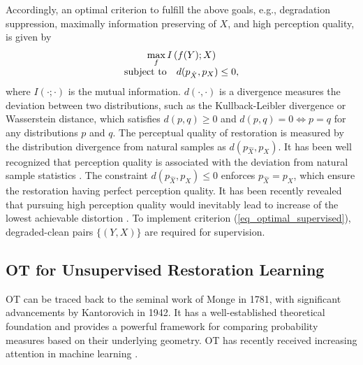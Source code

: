 \documentclass[10pt,journal,compsoc]{IEEEtran}
\begin{document}
Accordingly, an optimal criterion to fulfill the above goals,
e.g., degradation suppression, maximally information preserving of $X$, 
and high perception quality, is given by
\begin{equation}
\begin{array}{c}
\mathop {\max }\limits_f I\left( {f(Y);X} \right)\\
{\rm{subject \ to \ }}~~d({p_{\hat X}},{p_{ X}}) \le 0,
\end{array}
\label{eq_optimal_supervised}
\end{equation}
where $I(\cdot;\cdot)$ is the mutual information.
$d(\cdot,\cdot)$ is a divergence measures 
the deviation between two distributions, 
such as the Kullback-Leibler divergence or Wasserstein distance, 
which satisfies $d(p, q) \geq 0$ and 
$d(p, q) = 0\Leftrightarrow {p = q}$ for any distributions $p$ and $q$. 
The perceptual quality of restoration is measured by the distribution 
divergence from natural samples as $d({p_{\hat X}},{p_{ X}})$.
It has been well recognized that perception quality
is associated with the deviation from natural sample statistics \cite{wang2006quality,mittal2012no,moorthy2011blind,SaadBC12 }. The constraint $d({p_{\hat X}},{p_{ X}}) \le 0$ enforces
${p_{\hat X}}={p_X}$, which ensure the restoration having perfect perception quality.
It has been recently revealed that 
pursuing high perception quality would inevitably 
lead to increase of the lowest 
achievable distortion \cite{blau2018perception,yan2021perceptual,blau2019rethinking, yan2022perceptual}.
To implement criterion (\ref{eq_optimal_supervised}),
degraded-clean pairs $\{(Y,X)\}$ are required for supervision.


\subsection{OT for Unsupervised Restoration Learning}

OT can be traced back to the seminal work of 
Monge \cite{monge1781memoire} in 1781, 
with significant advancements by Kantorovich 
\cite{kantorovich1942translation} in 1942. 
It has a well-established theoretical foundation 
and provides a powerful framework for comparing 
probability measures based on their underlying geometry.
OT has recently received increasing attention in machine learning \cite{kolouri2017optimal,Villani2003,wgan}.
\end{document}
